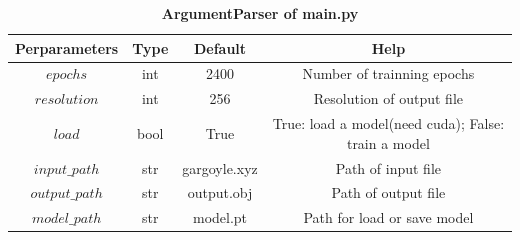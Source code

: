 \documentclass{ctexart}
\begin{document}
\begin{table}[!htbp]
    \centering
    \begin{tabular}{|c|c|c|c|}
        \hline
        \textbf{Perparameters} & \textbf{Type} & \textbf{Default} & \textbf{Help}                                       \\
        \hline
        $epochs$               & int           & 2400             & Number of trainning epochs                          \\
        \hline
        $resolution$           & int           & 256              & Resolution of output file                           \\
        \hline
        $load$                 & bool          & True             & True: load a model(need cuda); False: train a model \\
        \hline
        $input\_path$          & str           & gargoyle.xyz     & Path of input file                                  \\
        \hline
        $output\_path$         & str           & output.obj       & Path of output file                                 \\
        \hline
        $model\_path$          & str           & model.pt         & Path for load or save model                         \\
        \hline
    \end{tabular}
    \renewcommand{\tablename}{Tab}
    \caption{\textbf{ArgumentParser of main.py}}
\end{table}
\end{document}
